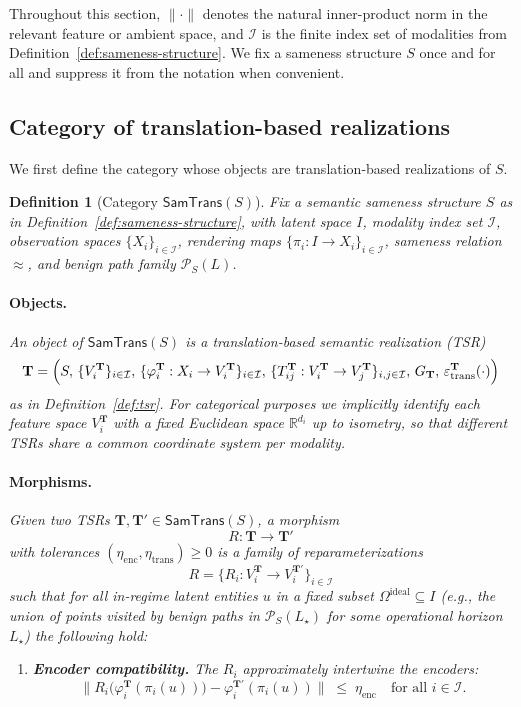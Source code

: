 \documentclass[11pt]{article}
\newtheorem{definition}{Definition}
\newcommand{\SamTrans}{\mathsf{SamTrans}}
\begin{document}
Throughout this section, $\|\cdot\|$ denotes the natural inner-product norm in the relevant feature
or ambient space, and $\mathcal{I}$ is the finite index set of modalities from
Definition~\ref{def:sameness-structure}. We fix a sameness structure $S$ once and for all and
suppress it from the notation when convenient.

\subsection{Category of translation-based realizations}
\label{subsec:samtrans}

We first define the category whose objects are translation-based realizations of $S$.

\begin{definition}[Category $\SamTrans(S)$]
\label{def:samtrans-category}
Fix a semantic sameness structure $S$ as in Definition~\ref{def:sameness-structure}, with latent
space $I$, modality index set $\mathcal{I}$, observation spaces $\{X_i\}_{i\in\mathcal{I}}$, rendering
maps $\{\pi_i : I \to X_i\}_{i\in\mathcal{I}}$, sameness relation $\approx$, and benign path family
$\mathcal{P}_S(L)$.

\paragraph{Objects.}
An object of $\SamTrans(S)$ is a translation-based semantic realization (TSR)
\[
\mathbf{T}
=
\Bigl(
S,\,
\{V_i^{\mathbf{T}}\}_{i\in\mathcal{I}},\,
\{\varphi_i^{\mathbf{T}} : X_i \to V_i^{\mathbf{T}}\}_{i\in\mathcal{I}},\,
\{T_{ij}^{\mathbf{T}} : V_i^{\mathbf{T}} \to V_j^{\mathbf{T}}\}_{i,j\in\mathcal{I}},\,
G_{\mathbf{T}},\,
\varepsilon_{\mathrm{trans}}^{\mathbf{T}}(\cdot)
\Bigr)
\]
as in Definition~\ref{def:tsr}. For categorical purposes we implicitly identify each feature space
$V_i^{\mathbf{T}}$ with a fixed Euclidean space $\mathbb{R}^{d_i}$ up to isometry, so that different
TSRs share a common coordinate system per modality.

\paragraph{Morphisms.}
Given two TSRs $\mathbf{T}, \mathbf{T}' \in \SamTrans(S)$, a morphism
\[
R : \mathbf{T} \to \mathbf{T}'
\]
with tolerances $(\eta_{\mathrm{enc}}, \eta_{\mathrm{trans}}) \ge 0$ is a family of reparameterizations
\[
R = \{R_i : V_i^{\mathbf{T}} \to V_i^{\mathbf{T}'}\}_{i\in\mathcal{I}}
\]
such that for all in-regime latent entities $u$ in a fixed subset $\Omega^{\mathrm{ideal}} \subseteq I$
(e.g., the union of points visited by benign paths in $\mathcal{P}_S(L_\star)$ for some operational
horizon $L_\star$) the following hold:
\begin{enumerate}[]
\item \textbf{Encoder compatibility.} The $R_i$ approximately intertwine the encoders:
\begin{equation}
\label{eq:tsr-enc-compat}
\bigl\|
R_i\bigl(\varphi_i^{\mathbf{T}}(\pi_i(u))\bigr)
-
\varphi_i^{\mathbf{T}'}(\pi_i(u))
\bigr\|
\;\le\;
\eta_{\mathrm{enc}}
\quad
\text{for all } i \in \mathcal{I}.
\end{equation}


\end{enumerate}
\end{definition}
\end{document}
